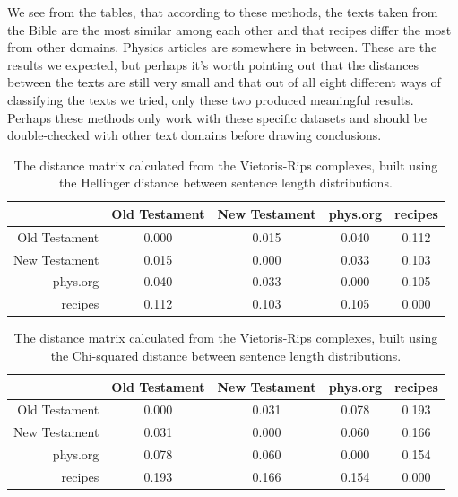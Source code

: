 \documentclass[12pt,a4paper]{amsart}
\begin{document}
We see from the tables, that according to these methods, the texts taken from
the Bible are the most similar among each other and that recipes differ the most
from other domains. Physics articles are somewhere in between. These are the
results we expected, but perhaps it's worth pointing out that the distances
between the texts are still very small and that out of all eight different ways
of classifying the texts we tried, only these two produced meaningful
results. Perhaps these methods only work with these specific datasets and should
be double-checked with other text domains before drawing conclusions.

\begin{table}
  \centering
  \begin{tabular}{r|cccc}
                  & Old Testament & New Testament & phys.org & recipes \\ \hline
    Old Testament & 0.000 & 0.015 & 0.040 & 0.112 \\
    New Testament & 0.015 & 0.000 & 0.033 & 0.103 \\
    phys.org      & 0.040 & 0.033 & 0.000 & 0.105 \\
    recipes       & 0.112 & 0.103 & 0.105 & 0.000 \\
  \end{tabular}

  \caption{The distance matrix calculated from the Vietoris-Rips complexes,
    built using the Hellinger distance between sentence length distributions.}
  \label{tab:hell}
\end{table}

\begin{table}
  \centering
  \begin{tabular}{r|cccc}
                  & Old Testament & New Testament & phys.org & recipes \\ \hline
    Old Testament & 0.000 & 0.031 & 0.078 & 0.193 \\
    New Testament & 0.031 & 0.000 & 0.060 & 0.166 \\
    phys.org      & 0.078 & 0.060 & 0.000 & 0.154 \\
    recipes       & 0.193 & 0.166 & 0.154 & 0.000 \\
  \end{tabular}
  \caption{The distance matrix calculated from the Vietoris-Rips complexes,
    built using the Chi-squared distance between sentence length distributions.}
  \label{tab:chi}
\end{table}
\end{document}
